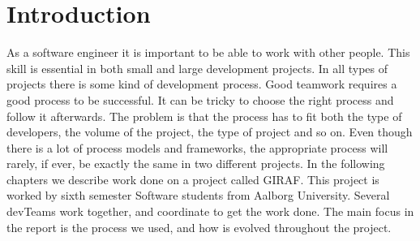 \part{Introduction}

As a software engineer it is important to be able to work with other people. This skill is essential in both small and large development projects. 
In all types of projects there is some kind of development process. Good teamwork requires a good process to be successful. It can be tricky to choose the right process and follow it afterwards. 
The problem is that the process has to fit both the type of developers, the volume of the project, the type of project and so on. 
Even though there is a lot of process models and frameworks, the appropriate process will rarely, if ever, be exactly the same in two different projects.
In the following chapters we describe work done on a project called GIRAF. This project is worked by sixth semester Software students from Aalborg University. Several \glspl{devTeam} work together, and coordinate to get the work done.
The main focus in the report is the process we used, and how is evolved throughout the project. 



